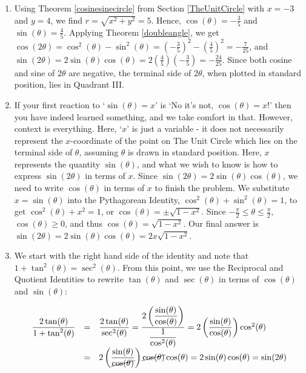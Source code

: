 {\begin{enumerate}

\item  Using Theorem \ref{cosinesinecircle} from Section \ref{TheUnitCircle} with  $x = -3$ and $y=4$, we find $r = \sqrt{x^2+y^2} = 5$.  Hence, $\cos(\theta) = -\frac{3}{5}$ and $\sin(\theta) = \frac{4}{5}$.  Applying Theorem \ref{doubleangle}, we get $\cos(2\theta) = \cos^{2}(\theta) - \sin^{2}(\theta) = \left(-\frac{3}{5}\right)^2 - \left(\frac{4}{5}\right)^2 = -\frac{7}{25}$, and $\sin(2\theta) = 2 \sin(\theta) \cos(\theta) = 2 \left(\frac{4}{5}\right)\left(-\frac{3}{5}\right) = -\frac{24}{25}$.  Since both cosine and sine of $2\theta$ are negative, the terminal side of $2\theta$, when plotted in standard position, lies in Quadrant III.


\item  If your first reaction to `$\sin(\theta) = x$' is `No it's not, $\cos(\theta) = x$!' then you have indeed learned something, and we take comfort in that. However, context is everything.  Here, `$x$' is just a variable - it does not necessarily represent the $x$-coordinate of the point on The Unit Circle which lies on the terminal side of $\theta$, assuming $\theta$ is drawn in standard position.  Here, $x$ represents the quantity $\sin(\theta)$, and what we wish to know is how to express $\sin(2\theta)$ in terms of $x$.    Since $\sin(2\theta) = 2 \sin(\theta) \cos(\theta)$, we need to write $\cos(\theta)$ in terms of $x$ to finish the problem.  We substitute $x = \sin(\theta)$ into the Pythagorean Identity, $\cos^{2}(\theta) + \sin^{2}(\theta) = 1$, to get $\cos^{2}(\theta) + x^2 = 1$, or $\cos(\theta) = \pm \sqrt{1-x^2}$.  Since  $-\frac{\pi}{2} \leq \theta \leq \frac{\pi}{2}$, $\cos(\theta) \geq 0$, and thus $\cos(\theta) = \sqrt{1-x^2}$.  Our final answer is  $\sin(2\theta) = 2 \sin(\theta) \cos(\theta) = 2x\sqrt{1-x^2}$.

\item  We start with the right hand side of the identity and note that $1 + \tan^{2}(\theta) = \sec^{2}(\theta)$.  From this point, we use the Reciprocal and Quotient Identities to rewrite $\tan(\theta)$ and $\sec(\theta)$ in terms of $\cos(\theta)$ and $\sin(\theta)$:


\[ \begin{array}{rcl}

\dfrac{2\tan(\theta)}{1 + \tan^{2}(\theta)} & = & \dfrac{2\tan(\theta)}{\sec^{2}(\theta)}= \dfrac{2 \left( \dfrac{\sin(\theta)}{\cos(\theta)}\right)}{\dfrac{1}{\cos^{2}(\theta)}}= 2\left( \dfrac{\sin(\theta)}{\cos(\theta)}\right) \cos^{2}(\theta) \\ [15pt]
																						& = & 2\left( \dfrac{\sin(\theta)}{\cancel{\cos(\theta)}}\right) \cancel{\cos(\theta)} \cos(\theta) = 2\sin(\theta) \cos(\theta) = \sin(2\theta) \\ 


\end{array}\]
\end{enumerate}}
